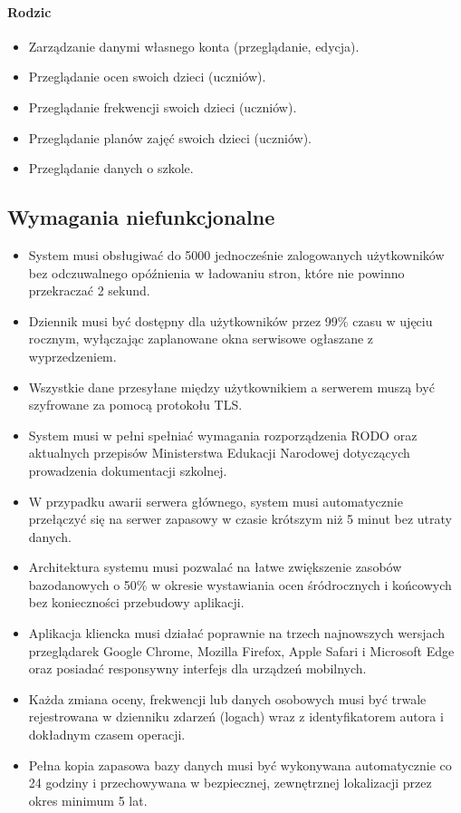 \documentclass[12pt,a4paper]{article}
\begin{document}
\paragraph{Rodzic}
\begin{itemize}
    \item Zarządzanie danymi własnego konta (przeglądanie, edycja).
    \item Przeglądanie ocen swoich dzieci (uczniów).
    \item Przeglądanie frekwencji swoich dzieci (uczniów).
    \item Przeglądanie planów zajęć swoich dzieci (uczniów).
    \item Przeglądanie danych o szkole.
\end{itemize}

\subsection{Wymagania niefunkcjonalne}
\begin{itemize}
    \item System musi obsługiwać do 5000 jednocześnie zalogowanych użytkowników bez odczuwalnego opóźnienia w ładowaniu stron, które nie powinno przekraczać 2 sekund.
    \item Dziennik musi być dostępny dla użytkowników przez 99\% czasu w ujęciu rocznym, wyłączając zaplanowane okna serwisowe ogłaszane z wyprzedzeniem.
    \item Wszystkie dane przesyłane między użytkownikiem a serwerem muszą być szyfrowane za pomocą protokołu TLS.
    \item System musi w pełni spełniać wymagania rozporządzenia RODO oraz aktualnych przepisów Ministerstwa Edukacji Narodowej dotyczących prowadzenia dokumentacji szkolnej.
    \item W przypadku awarii serwera głównego, system musi automatycznie przełączyć się na serwer zapasowy w czasie krótszym niż 5 minut bez utraty danych.
    \item Architektura systemu musi pozwalać na łatwe zwiększenie zasobów bazodanowych o 50\% w okresie wystawiania ocen śródrocznych i końcowych bez konieczności przebudowy aplikacji.
    \item Aplikacja kliencka musi działać poprawnie na trzech najnowszych wersjach przeglądarek Google Chrome, Mozilla Firefox, Apple Safari i Microsoft Edge oraz posiadać responsywny interfejs dla urządzeń mobilnych.
    \item Każda zmiana oceny, frekwencji lub danych osobowych musi być trwale rejestrowana w dzienniku zdarzeń (logach) wraz z identyfikatorem autora i dokładnym czasem operacji.
    \item Pełna kopia zapasowa bazy danych musi być wykonywana automatycznie co 24 godziny i przechowywana w bezpiecznej, zewnętrznej lokalizacji przez okres minimum 5 lat.
\end{itemize}
\end{document}
